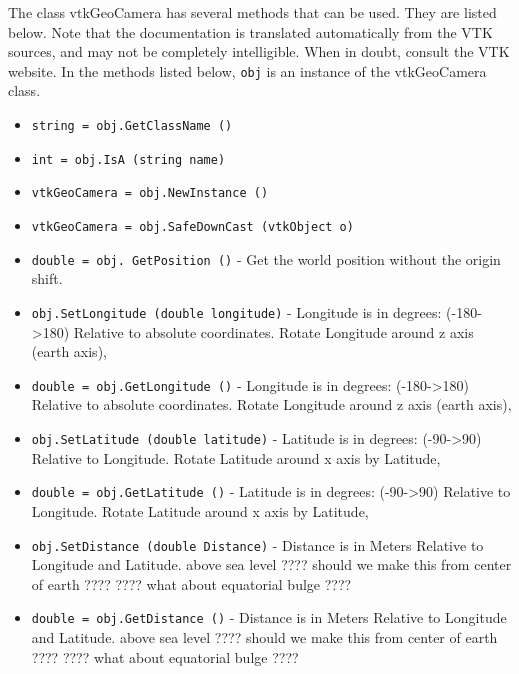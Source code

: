The class vtkGeoCamera has several methods that can be used.
  They are listed below.
Note that the documentation is translated automatically from the VTK sources,
and may not be completely intelligible.  When in doubt, consult the VTK website.
In the methods listed below, \verb|obj| is an instance of the vtkGeoCamera class.
\begin{itemize}
\item  \verb|string = obj.GetClassName ()|

\item  \verb|int = obj.IsA (string name)|

\item  \verb|vtkGeoCamera = obj.NewInstance ()|

\item  \verb|vtkGeoCamera = obj.SafeDownCast (vtkObject o)|

\item  \verb|double = obj. GetPosition ()| -  Get the world position without the origin shift.

\item  \verb|obj.SetLongitude (double longitude)| -  Longitude is in degrees: (-180->180)
   Relative to absolute coordinates.
  Rotate Longitude  around z axis (earth axis),

\item  \verb|double = obj.GetLongitude ()| -  Longitude is in degrees: (-180->180)
   Relative to absolute coordinates.
  Rotate Longitude  around z axis (earth axis),

\item  \verb|obj.SetLatitude (double latitude)| -   Latitude is in degrees: (-90->90)
    Relative to Longitude.
  Rotate Latitude   around x axis by Latitude, 

\item  \verb|double = obj.GetLatitude ()| -   Latitude is in degrees: (-90->90)
    Relative to Longitude.
  Rotate Latitude   around x axis by Latitude, 

\item  \verb|obj.SetDistance (double Distance)| -  Distance is in Meters
   Relative to Longitude and Latitude.
   above sea level   ???? should we make this from center of earth ????
                    ???? what about equatorial bulge ????

\item  \verb|double = obj.GetDistance ()| -  Distance is in Meters
   Relative to Longitude and Latitude.
   above sea level   ???? should we make this from center of earth ????
                    ???? what about equatorial bulge ????


\end{itemize}
